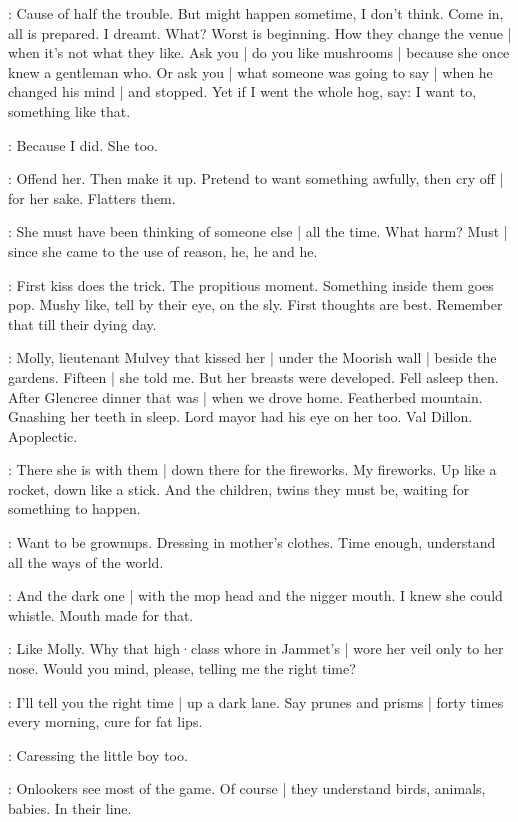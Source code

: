 \BloomAbstract:
Cause of half the trouble.
But might happen sometime,
I don't think.
Come in,
all is prepared.
I dreamt.
What?
Worst is beginning.
How they change the venue |
when it's not what they like.%
Ask you |
do you like mushrooms |
because she once knew a gentleman who.
Or ask you |
what someone was going to say |
when he changed his mind |
and stopped.
Yet if I went the whole hog,
say:
I want to,
something like that.

\BloomCurrent:
Because I did.
She too.

\BloomAbstract:
Offend her.
Then make it up.
Pretend to want something awfully,
then cry off |
for her sake.
Flatters them.

\BloomCurrent:
She must have been thinking of someone else |
all the time.
What harm?
Must |
since she came to the use of reason,
he,
he and he.

\BloomAbstract:
First kiss does the trick.
The propitious moment.
Something inside them goes pop.
Mushy like,
tell by their eye,
on the sly.
First thoughts are best.
Remember that
till their dying day.

\BloomHist:
Molly,
lieutenant Mulvey that kissed her |
under the Moorish wall |
beside the gardens.%
Fifteen |
she told me.
But her breasts were developed.
Fell asleep then.
After Glencree dinner that was |
when we drove home.
Featherbed mountain.
Gnashing her teeth in sleep.
Lord mayor had his eye on her too.
Val Dillon.
Apoplectic.

\BloomCurrent:
There she is with them |
down there for the fireworks.
My fireworks.
Up like a rocket,
down like a stick.
And the children,
twins they must be,
waiting for something to happen.

\BloomAbstract:
Want to be grownups.
Dressing in mother's clothes.
Time enough,
understand all the ways of the world.

\BloomCurrent:
And the dark one |
with the mop head
and the nigger mouth.
I knew she could whistle.
Mouth made for that.

\BloomHist:
Like Molly.
Why that high·class whore in Jammet's |
wore her veil
only to her nose.%
Would you mind,
please,
telling me the right time?

\BloomAbstract:
I'll tell you the right time |
up a dark lane.
Say prunes and prisms |
forty times every morning,
cure for fat lips.

\BloomCurrent:
Caressing the little boy too.

\BloomAbstract:
Onlookers see most of the game.
Of course |
they understand birds,
animals,
babies.
In their line.

